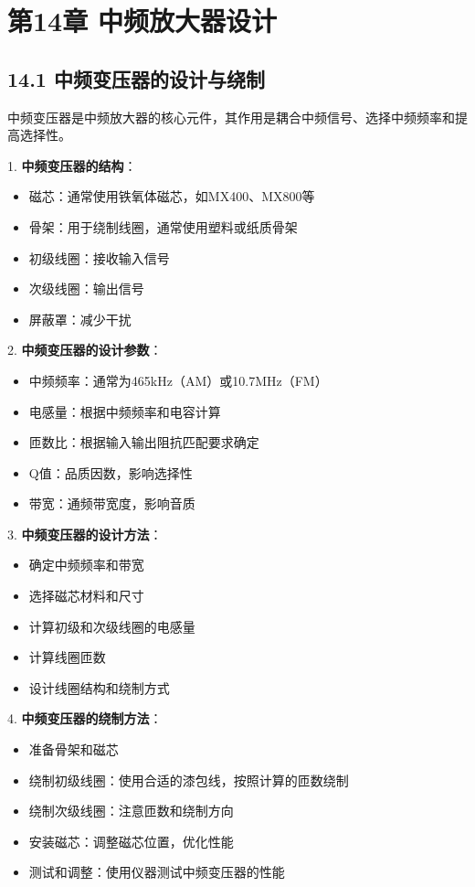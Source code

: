 \documentclass[12pt,UTF8]{ctexbook}
\begin{document}
\chapter*{第14章 中频放大器设计}
\section*{14.1 中频变压器的设计与绕制}

中频变压器是中频放大器的核心元件，其作用是耦合中频信号、选择中频频率和提高选择性。

1. \textbf{中频变压器的结构}：
   \begin{itemize}[leftmargin=3.5em]
   \item 磁芯：通常使用铁氧体磁芯，如MX400、MX800等
   \item 骨架：用于绕制线圈，通常使用塑料或纸质骨架
   \item 初级线圈：接收输入信号
   \item 次级线圈：输出信号
   \item 屏蔽罩：减少干扰
   \end{itemize}

2. \textbf{中频变压器的设计参数}：
   \begin{itemize}[leftmargin=3.5em]
   \item 中频频率：通常为465kHz（AM）或10.7MHz（FM）
   \item 电感量：根据中频频率和电容计算
   \item 匝数比：根据输入输出阻抗匹配要求确定
   \item Q值：品质因数，影响选择性
   \item 带宽：通频带宽度，影响音质
   \end{itemize}

3. \textbf{中频变压器的设计方法}：
   \begin{itemize}[leftmargin=3.5em]
   \item 确定中频频率和带宽
   \item 选择磁芯材料和尺寸
   \item 计算初级和次级线圈的电感量
   \item 计算线圈匝数
   \item 设计线圈结构和绕制方式
   \end{itemize}

4. \textbf{中频变压器的绕制方法}：
   \begin{itemize}[leftmargin=3.5em]
   \item 准备骨架和磁芯
   \item 绕制初级线圈：使用合适的漆包线，按照计算的匝数绕制
   \item 绕制次级线圈：注意匝数和绕制方向
   \item 安装磁芯：调整磁芯位置，优化性能
   \item 测试和调整：使用仪器测试中频变压器的性能
   \end{itemize}
\end{document}
